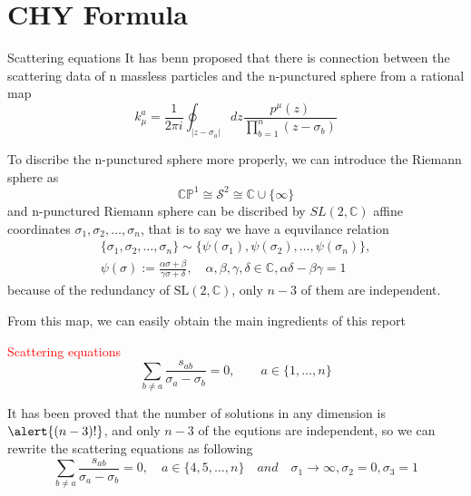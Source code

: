 \documentclass{beamer}
\begin{document}
\section{CHY Formula}
\begin{frame}{Scattering equations}
    It has benn proposed that there is connection between the scattering data of n massless particles and the n-punctured sphere from a rational map
    \begin{equation*}
        k_\mu^a=\frac{1}{2\pi i}\oint_{|z-\sigma_a|}dz\frac{p^\mu(z)}{\prod ^n_{b=1}(z-\sigma_b)}
    \end{equation*}
 
    To discribe the n-punctured sphere more properly, we can introduce the Riemann sphere as
    \begin{equation*}
        \mathbb{CP}^1\cong \mathcal{S}^2\cong \mathbb{C}\cup\{\infty\}
    \end{equation*}
    and n-punctured Riemann sphere can be discribed by $SL(2,\mathbb{C})$ affine coordinates ${\sigma_1,\sigma_2,\ldots,\sigma_n}$, that is to say we have a equvilance relation
    \begin{align*}
        \{\sigma_1,\sigma_2,\ldots,\sigma_n\}\sim\{\psi(\sigma_1),\psi(\sigma_2),\ldots,\psi(\sigma_n)\},\\\psi(\sigma):=\frac{\alpha\sigma+\beta}{\gamma\sigma+\delta},\quad\alpha,\beta,\gamma,\delta\in\mathbb{C},\alpha\delta-\beta\gamma=1
    \end{align*}
    because of the redundancy of $\mathrm{SL}(2,\mathbb{C})$, only $n-3$ of them are independent.
\end{frame}
\begin{frame}
    From this map, we can easily obtain the main ingredients of this report \\
    

    \begin{block}{\textcolor{red}{Scattering equations}}
        \begin{equation*}
            \sum_{b\neq a } \frac{s_{ab}}{\sigma_a-\sigma_{b}}=0,\qquad a\in \{1,\dots,n\}
        \end{equation*}
    \end{block}
    It has been proved that the number of solutions in any dimension is $\alert{(n-3)!}$, and only \alert{$n-3$} of the equtions are independent, so we can rewrite the scattering equations as following 
    \begin{equation*}
        \sum_{b\neq a } \frac{s_{ab}}{\sigma_a-\sigma_{b}}=0,\quad a\in \{4,5,\dots,n\}\quad and\quad  \sigma_1\rightarrow\infty,\sigma_2=0,\sigma_3=1
    \end{equation*}
\end{frame}
\fi
\end{document}
